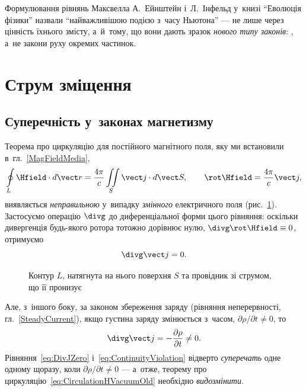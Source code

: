 Формулювання рівнянь Максвелла А.~Ейнштейн і~Л.~Інфельд у~книзі \enquote{Еволюція фізики}
назвали \enquote{найважливішою подією з~часу Ньютона} --- не лише через цінність їхнього
змісту, а~й~тому, що вони дають зразок \emph{нового типу законів}: , а~не закони руху окремих частинок.


\section{Струм зміщення}\hypertarget{displacement-current}{}


\subsection*{Суперечність у~законах магнетизму}


Теорема про циркуляцію для постійного магнітного поля, яку ми встановили
в~гл.~\ref{MagFieldMedia},
\begin{equation}\label{eq:CirculationHVacuumOld}
	\oint\limits_L \Hfield\cdot d\vect r = \frac{4\pi}{c}\iint\limits_S \vect j\cdot d\vect S, \qquad \rot\Hfield = \frac{4\pi}{c}\vect j,
\end{equation}
виявляється \emph{неправильною} у~випадку \emph{змінного} електричного поля
(рис.~\ref{pic:CircThm}). Застосуємо операцію $\divg$ до диференціальної форми цього
рівняння: оскільки дивергенція будь-якого ротора тотожно дорівнює нулю, $\divg\rot\Hfield
\equiv 0$, отримуємо
\begin{equation}\label{eq:DivJZero}
	\divg\vect j = 0.
\end{equation}

\begin{figure}\centering
	\caption{Контур $L$, натягнута на нього поверхня $S$ та провідник зі струмом, що її
	пронизує\label{pic:CircThm}}
\end{figure}

Але, з~іншого боку, за законом збереження заряду (рівняння неперервності,
гл.~\ref{SteadyCurrent}), якщо густина заряду змінюється з~часом, $\partial\rho/\partial t
\neq 0$, то
\begin{equation}\label{eq:ContinuityViolation}
	\divg\vect j = -\frac{\partial\rho}{\partial t} \neq 0.
\end{equation}
Рівняння~\eqref{eq:DivJZero} і~\eqref{eq:ContinuityViolation} відверто \emph{суперечать}
одне одному щоразу, коли $\partial\rho/\partial t\neq0$ --- а~отже, теорему про
циркуляцію~\eqref{eq:CirculationHVacuumOld} необхідно \emph{видозмінити}.


